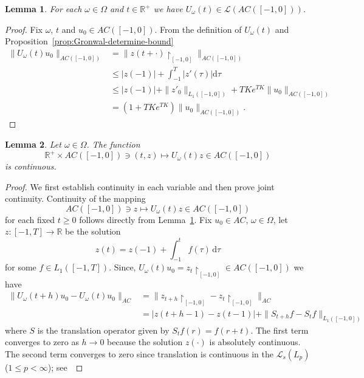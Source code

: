 \documentclass[reqno]{amsart}
\theoremstyle{plain}
\newtheorem{lemma}{Lemma}[section]
\numberwithin{equation}{section}
\numberwithin{definition}{section}
\newcommand\RR{\ensuremath{\mathbb{R}}}
\newcommand{\dd}{\ensuremath{\mathrm{d}}}
\begin{document}
{\begin{lemma}\label{lemma:U-cont-Ac}
For each $\omega\in \Omega$ and $t\in \RR^+$ we have $U_{\omega}(t)\in \mathcal{L}(AC([-1,0]))$. 
\end{lemma}
\begin{proof} Fix $\omega$, $t$ and $u_0\in AC([-1,0])$. From the definition of $U_\omega(t)$ and Proposition~\ref{prop:Gronwal-determine-bound}
\begin{equation*}
    \begin{split}
\|U_\omega(t)u_0\|_{AC([-1,0])} & = \| z(t + \cdot){\restriction}_{[-1, 0]} \|_{AC([-1,0])} \\
&\le |z(-1)| + \int_{-1}^T |z'(\tau)| \dd\tau \\
&\le |z(-1)| + \|z'_0\|_{L_1([-1,0])} + TK e^{TK}\|u_0\|_{AC([-1,0])} \\
&= (1 + TKe^{TK})\|u_0\|_{AC([-1,0])}.
    \end{split}
\end{equation*}
\end{proof}
\begin{lemma}\label{lemma:joint-continu}
Let $\omega \in \Omega$. The function
\begin{equation*}
    \mathbb{R}^+ \times AC([-1,0]) \ni (t, z) \mapsto U_\omega(t)z \in AC([-1,0]) 
\end{equation*}
is continuous.
\end{lemma}
\begin{proof}  We first establish continuity in each variable and then prove joint continuity. Continuity of the mapping 
    \begin{equation*}
     AC([-1,0]) \ni z \mapsto U_\omega(t)z \in AC([-1,0]) 
\end{equation*}
for each fixed $t\geq0$ follows directly from Lemma~\ref{lemma:U-cont-Ac}. Fix $u_0 \in AC$, $\omega \in \Omega$, let $z: [-1, T] \to \mathbb{R}$ be the solution
\begin{equation}
z(t) = z(-1)+ \int_{-1}^t f(\tau) \,\dd\tau
\end{equation}
for some $f \in L_1([-1, T])$. Since, $  U_\omega(t)u_0 = z_t{\restriction}_{[-1, 0]} \in AC([-1,0])$ we have 
\begin{equation*}
    \begin{split}
        \|U_\omega(t+h)u_0 - U_\omega(t)u_0\|_{AC} &= \|z_{t+h}{\restriction}_{[-1, 0]} - z_t{\restriction}_{[-1, 0]}\|_{AC} \\
&= |z(t+h-1) - z(t-1)| + \| S_{t+h} f - S_t f \|_{L_1([-1, 0])}
    \end{split}
\end{equation*}
where $S$ is the translation operator given by 
$S_t f(r) = f(r+t)$. The first term converges to zero as $h \to 0$ because the solution $z(\cdot)$ is absolutely continuous. The second term converges to zero since translation is continuous in the $\mathcal{L}_{s}(L_p)$($1\le p < \infty$); see~\cite[Prop. 8.5]{Folland} 



\end{proof}}
\end{document}
